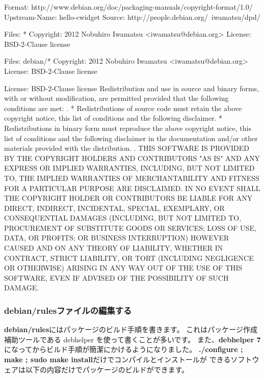 \documentclass[mingoth,a4paper]{jsarticle}
\begin{document}
\begin{commandline}
Format: http://www.debian.org/doc/packaging-manuals/copyright-format/1.0/
Upstream-Name: hello-cwidget
Source: http://people.debian.org/~iwamatsu/dpd/

Files: *
Copyright: 2012 Nobuhiro Iwamatsu <iwamatsu@debian.org>
License: BSD-2-Clause license

Files: debian/*
Copyright: 2012 Nobuhiro Iwamatsu <iwamatsu@debian.org>
License: BSD-2-Clause license

License: BSD-2-Clause license
 Redistribution and use in source and binary forms, with or without
 modification, are permitted provided that the following conditions are 
 met:
 .
 * Redistributions of source code must retain the above copyright notice,
   this list of conditions and the following disclaimer.
 * Redistributions in binary form must reproduce the above copyright notice,
   this list of conditions and the following disclaimer in the documentation
   and/or other materials provided with the distribution.
 .
 THIS SOFTWARE IS PROVIDED BY THE COPYRIGHT HOLDERS AND CONTRIBUTORS "AS IS" 
 AND ANY EXPRESS OR IMPLIED WARRANTIES, INCLUDING, BUT NOT LIMITED TO, 
 THE IMPLIED WARRANTIES OF MERCHANTABILITY AND FITNESS FOR A PARTICULAR
 PURPOSE ARE DISCLAIMED. IN NO EVENT SHALL THE COPYRIGHT HOLDER OR CONTRIBUTORS
 BE LIABLE FOR ANY DIRECT, INDIRECT, INCIDENTAL, SPECIAL, EXEMPLARY, OR
 CONSEQUENTIAL DAMAGES (INCLUDING, BUT NOT LIMITED TO, PROCUREMENT OF SUBSTITUTE
 GOODS OR SERVICES; LOSS OF USE, DATA, OR PROFITS; OR BUSINESS INTERRUPTION)
 HOWEVER CAUSED AND ON ANY THEORY OF LIABILITY, WHETHER IN CONTRACT, STRICT
 LIABILITY, OR TORT (INCLUDING NEGLIGENCE OR OTHERWISE) ARISING IN ANY WAY OUT 
 OF THE USE OF THIS SOFTWARE, EVEN IF ADVISED OF THE POSSIBILITY OF SUCH DAMAGE.
\end{commandline}


\subsubsection{debian/rulesファイルの編集する}

{\bf debian/rules}にはパッケージのビルド手順を書きます。
これはパッケージ作成補助ツールである debhelper を使って書くことが多いです。
また、{\bf debhelper 7}になってからビルド手順が簡潔にかけるようになりました。
{\bf ./configure ; make ; sudo make install}だけでコンパイルとインストールが
できるソフトウェアは以下の内容だけでパッケージのビルドができます。

\end{document}
